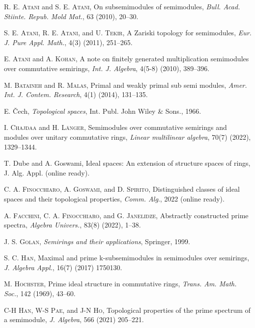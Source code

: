 \documentclass[12pt,english]{smfart}
\theoremstyle{definition}
\begin{document}
\begin{thebibliography}{1}
	
\textsc{R. E. Atani} and \textsc{S. E. Atani}, On subsemimodules of semimodules, \textit{Bull. Acad. Stiinte.
Repub. Mold Mat.}, 63 (2010), 20--30.

\textsc{S. E. Atani}, \textsc{R. E. Atani}, and \textsc{U. Tekir}, A Zariski topology for semimodules, \textit{Eur. J. Pure Appl. Math.},
4(3) (2011), 251--265.

\textsc{E. Atani} and \textsc{A. Kohan}, A note on finitely generated multiplication semimodules over commutative semirings, \textit{Int. J. Algebra}, 4(5-8) (2010), 389--396.

\textsc{M. Bataineh} and
\textsc{R. Malas},  Primal and weakly primal sub semi modules, \textit{Amer. Int. J. Contem. Research}, 4(1) (2014), 131--135.
  
E. \v{C}ech,  \emph{Topological spaces}, Int. Publ. John Wiley \& Sons., 1966.

\textsc{I. Chajdaa} and \textsc{H. L\"{a}nger}, Semimodules over commutative semirings and modules over
unitary commutative rings, \textit{Linear multilinear algebra}, 70(7) (2022), 1329--1344.

 T. Dube and A. Goswami, Ideal spaces: An extension of structure spaces of rings, J. Alg. Appl. (online ready). 
 
 \textsc{C. A. Finocchiaro}, \textsc{A. Goswami}, and \textsc{D. Spirito}, Distinguished classes of ideal spaces and their topological properties, \textit{Comm. Alg}., 2022 (online ready).

 \textsc{A. Facchini}, \textsc{C. A. Finocchiaro}, and
\textsc{G. Janelidze}, Abstractly constructed prime spectra, \textit{Algebra Univers.}, 83(8) (2022), 1--38.
 
\textsc{J. S. Golan}, \textit{Semirings and their applications}, Springer, 1999.

\textsc{S. C. Han}, Maximal and prime k-subsemimodules in semimodules over semirings, \textit{J. Algebra Appl.},
16(7) (2017) 1750130.

\textsc{M. Hochster}, Prime ideal structure in commutative rings, \textit{Trans. Am. Math. Soc.}, 142 (1969), 43--60.

 \textsc{C-H Han}, \textsc{W-S Pae}, and \textsc{J-N Ho}, Topological properties of the prime spectrum of
a semimodule, \textit{J. Algebra}, 566 (2021) 205--221.


\end{thebibliography}
\end{document}
